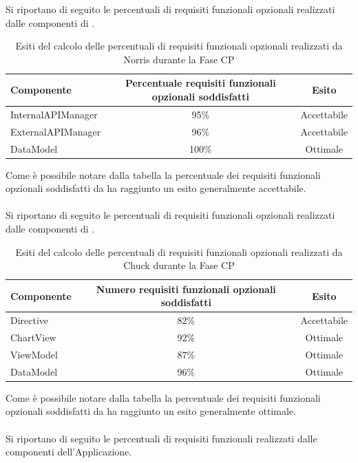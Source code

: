 Si riportano di seguito le percentuali di requisiti funzionali opzionali realizzati dalle componenti di .
\begin{table}[H]
	\centering
		\begin{tabu}{| l | c | c |}
			\hline
			Componente	& Percentuale requisiti funzionali opzionali soddisfatti	& Esito		\\ \hline \hline
			InternalAPIManager	& 95\% 	& Accettabile  \\ \hline
			ExternalAPIManager  & 	96\%	& Accettabile  \\ \hline
			DataModel  & 	100\%	& Ottimale  \\ \hline
		\end{tabu}
	\caption{Esiti del calcolo delle percentuali di requisiti funzionali opzionali realizzati da Norris durante la Fase CP}
\end{table}
Come è possibile notare dalla tabella la percentuale dei requisiti funzionali opzionali soddisfatti da  ha raggiunto un esito generalmente accettabile. 
\\ \\
Si riportano di seguito le percentuali di requisiti funzionali opzionali realizzati dalle componenti di .
\begin{table}[H]
	\centering
		\begin{tabu}{| l | c | c |}
			\hline
			Componente	& Numero requisiti funzionali opzionali soddisfatti	& Esito		\\ \hline \hline
			Directive	& 82\% 	& Accettabile  \\ \hline
			ChartView  & 	92\%	& Ottimale  \\ \hline
			ViewModel  & 	87\%	& Ottimale  \\ \hline
			DataModel  & 	96\%	& Ottimale  \\ \hline
		\end{tabu}
	\caption{Esiti del calcolo delle percentuali di requisiti funzionali opzionali realizzati da Chuck durante la Fase CP}
\end{table}
Come è possibile notare dalla tabella la percentuale dei requisiti funzionali opzionali soddisfatti da  ha raggiunto un esito generalmente ottimale.
\\ \\
Si riportano di seguito le percentuali di requisiti funzionali realizzati dalle componenti dell'Applicazione.
